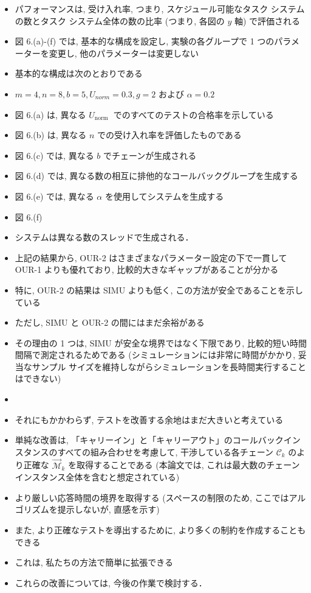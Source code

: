 \begin{frame}{}
    \begin{itemize}
        \item パフォーマンスは, 受け入れ率, つまり, スケジュール可能なタスク システムの数とタスク システム全体の数の比率 (つまり, 各図の $y$ 軸) で評価される
\item 図 6.(a)-(f) では, 基本的な構成を設定し, 実験の各グループで 1 つのパラメーターを変更し, 他のパラメーターは変更しない
\item 基本的な構成は次のとおりである
\item $m=4, n=8, b=5, U_{n o r m}=0.3, g=2$ および $\alpha=0.2$ 
\item 図 6.(a) は, 異なる $U_{\text {norm }}$ でのすべてのテストの合格率を示している
\item 図 6.(b) は, 異なる $n$ での受け入れ率を評価したものである
\item 図 6.(c) では, 異なる $b$ でチェーンが生成される
\item 図 6.(d) では, 異なる数の相互に排他的なコールバックグループを生成する
\item 図 6.(e) では, 異なる $\alpha$ を使用してシステムを生成する
\item 図 6.(f)
\item システムは異なる数のスレッドで生成される．
    \end{itemize}
\end{frame}


\begin{frame}{}
    \begin{itemize}
        \item 上記の結果から, OUR-2 はさまざまなパラメーター設定の下で一貫して OUR-1 よりも優れており, 比較的大きなギャップがあることが分かる
\item 特に, OUR-2 の結果は SIMU よりも低く, この方法が安全であることを示している
\item ただし, SIMU と OUR-2 の間にはまだ余裕がある
\item その理由の 1 つは, SIMU が安全な境界ではなく下限であり, 比較的短い時間間隔で測定されるためである (シミュレーションには非常に時間がかかり, 妥当なサンプル サイズを維持しながらシミュレーションを長時間実行することはできない)
\item
\item それにもかかわらず, テストを改善する余地はまだ大きいと考えている
\item 単純な改善は, 「キャリーイン」と「キャリーアウト」のコールバックインスタンスのすべての組み合わせを考慮して, 干渉している各チェーン $\mathcal{C}_{k}$ のより正確な $\overrightarrow{\mathcal{M}}_{k}$ を取得することである (本論文では, これは最大数のチェーンインスタンス全体を含むと想定されている)
\item より厳しい応答時間の境界を取得する (スペースの制限のため, ここではアルゴリズムを提示しないが, 直感を示す)
\item また, より正確なテストを導出するために, より多くの制約を作成することもできる
\item これは, 私たちの方法で簡単に拡張できる
\item これらの改善については, 今後の作業で検討する．
    \end{itemize}
\end{frame}


